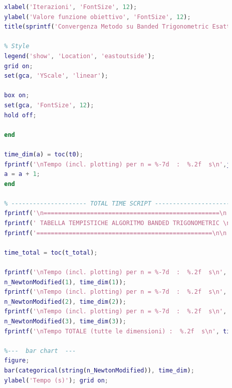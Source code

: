 \documentclass[a4paper,12pt]{article}
\begin{document}
\begin{lstlisting}[language=Matlab,caption={Full script: Modified Newton method on Banded Trigonometric},label={lst:rosenbrock-extended}]
		% Titles
		xlabel('Iterazioni', 'FontSize', 12);
		ylabel('Valore funzione obiettivo', 'FontSize', 12);
		title(sprintf('Convergenza Metodo su Banded Trigonometric Esatto (n = %d)', j), 'FontSize', 14);
		
		% Style
		legend('show', 'Location', 'eastoutside');
		grid on;
		set(gca, 'YScale', 'linear');
		
		box on;
		set(gca, 'FontSize', 12);
		hold off;
		
		end
		
		time_dim(a) = toc(t0);
		fprintf('\nTempo (incl. plotting) per n = %-7d  :  %.2f  s\n',j, time_dim(a));
		a = a + 1;
		end
		
		% --------------------- TOTAL TIME SCRIPT ----------------------
		fprintf('\n=================================================\n');
		fprintf(' TABELLA TEMPISTICHE ALGORITMO BANDED TRIGONOMETRIC \n');
		fprintf('=================================================\n\n');
		
		time_total = toc(t_total);
		
		fprintf('\nTempo (incl. plotting) per n = %-7d  :  %.2f  s\n', ...
		n_NewtonModified(1), time_dim(1));
		fprintf('\nTempo (incl. plotting) per n = %-7d  :  %.2f  s\n', ...
		n_NewtonModified(2), time_dim(2));
		fprintf('\nTempo (incl. plotting) per n = %-7d  :  %.2f  s\n', ...
		n_NewtonModified(3), time_dim(3));
		fprintf('\nTempo TOTALE (tutte le dimensioni) :  %.2f  s\n', time_total);
		
		%---  bar chart  ---
		figure;
		bar(categorical(string(n_NewtonModified)), time_dim);
		ylabel('Tempo (s)'); grid on;
	\end{lstlisting}
	\newpage
\end{document}

